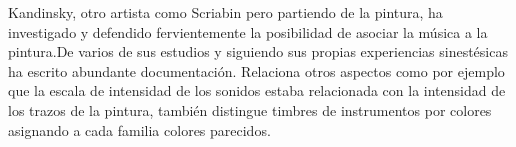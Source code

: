 Kandinsky, otro artista como Scriabin pero partiendo de la pintura, ha investigado y defendido fervientemente la posibilidad de asociar la música a la pintura.De varios de sus estudios y siguiendo sus propias experiencias sinestésicas ha escrito abundante documentación. Relaciona otros aspectos como por ejemplo que la escala de intensidad de los sonidos estaba relacionada con la intensidad de los trazos de la pintura, también distingue timbres de instrumentos por colores asignando a cada familia colores parecidos. \\
